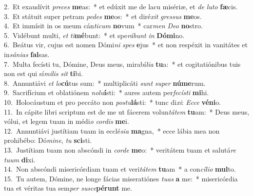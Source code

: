{2.~}Et exaudívit \textit{pre}\textit{ces} \textbf{me}as:~* et edúxit me de lacu misériæ, et \textit{de} \textit{lu}\textit{to} \textbf{fæ}cis.\\
{3.~}Et státuit super petram \textit{pe}\textit{des} \textbf{me}os:~* et diré\textit{xit} \textit{gres}\textit{sus} \textbf{me}os.\\
{4.~}Et immísit in os meum cán\textit{ti}\textit{cum} \textbf{no}vum~* car\textit{men} \textit{De}\textit{o} \textbf{no}stro.\\
{5.~}Vidébunt multi, \textit{et} \textit{ti}\textbf{mé}bunt:~* et spe\textit{rá}\textit{bunt} \textit{in} \textbf{Dó}\textbf{mi}no.\\
{6.~}Beátus vir, cujus est nomen Dómi\textit{ni} \textit{spes} \textbf{e}jus~* et non respéxit in vanitátes et in\textit{sá}\textit{ni}\textit{as} \textbf{fal}sas.\\
{7.~}Multa fecísti tu, Dómine, Deus meus, mirabí\textit{li}\textit{a} \textbf{tu}a:~* et cogitatiónibus tuis non est qui sí\textit{mi}\textit{lis} \textit{sit} \textbf{ti}bi.\\
{8.~}Annuntiávi \textit{et} \textit{lo}\textbf{cú}tus sum:~* multiplicáti \textit{sunt} \textit{su}\textit{per} \textbf{nú}\textbf{me}rum.\\
{9.~}Sacrifícium et oblatiónem \textit{no}\textit{lu}\textbf{í}sti:~* aures autem per\textit{fe}\textit{cí}\textit{sti} \textbf{mi}hi.\\
{10.~}Holocáustum et pro peccáto non \textit{po}\textit{stu}\textbf{lá}sti:~* tunc di\textit{xi}: \textit{Ec}\textit{ce} \textbf{vé}\textbf{ni}o.\\
{11.~}In cápite libri scriptum est de me ut fácerem volun\textit{tá}\textit{tem} \textbf{tu}am:~* Deus meus, vólui, et legem tuam in médi\textit{o} \textit{cor}\textit{dis} \textbf{me}i.\\
{12.~}Annuntiávi justítiam tuam in ecclé\textit{si}\textit{a} \textbf{ma}gna,~* ecce lábia mea non prohibébo: Dó\textit{mi}\textit{ne}, \textit{tu} \textbf{sci}sti.\\
{13.~}Justítiam tuam non abscóndi in \textit{cor}\textit{de} \textbf{me}o:~* veritátem tuam et salutá\textit{re} \textit{tu}\textit{um} \textbf{di}xi.\\
{14.~}Non abscóndi misericórdiam tuam et veri\textit{tá}\textit{tem} \textbf{tu}am~* a con\textit{cí}\textit{li}\textit{o} \textbf{mul}to.\\
{15.~}Tu autem, Dómine, ne longe fácias miseratiónes \textit{tu}\textit{as} \textbf{a} me:~* misericórdia tua et véritas tua sem\textit{per} \textit{su}\textit{sce}\textbf{pé}\textbf{runt} me.\\
